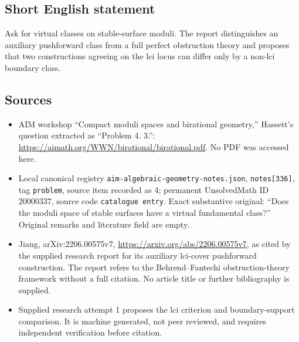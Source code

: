 \documentclass[11pt]{article}
\begin{document}
\subsection{Short English statement}
Ask for virtual classes on stable-surface moduli. The report distinguishes an auxiliary pushforward class from a full perfect obstruction theory and proposes that two constructions agreeing on the lci locus can differ only by a non-lci boundary class.
\subsection{Sources}
\begin{itemize}
\item AIM workshop ``Compact moduli spaces and birational geometry,'' Hassett's question extracted as ``Problem 4. 3.'': \url{https://aimath.org/WWN/birational/birational.pdf}. No PDF was accessed here.
\item Local canonical registry \texttt{aim-algebraic-geometry-notes.json}, \texttt{notes[336]}, tag \texttt{problem}, source item recorded as 4; permanent UnsolvedMath ID \(20000337\), source code \texttt{catalogue entry}. Exact substantive original: ``Does the moduli space of stable surfaces have a virtual fundamental class?'' Original remarks and literature field are empty.
\item Jiang, arXiv:2206.00575v7, \url{https://arxiv.org/abs/2206.00575v7}, as cited by the supplied research report for its auxiliary lci-cover pushforward construction. The report refers to the Behrend--Fantechi obstruction-theory framework without a full citation. No article title or further bibliography is supplied.
\item Supplied research attempt 1 proposes the lci criterion and boundary-support comparison. It is machine generated, not peer reviewed, and requires independent verification before citation.
\end{itemize}
\end{document}
